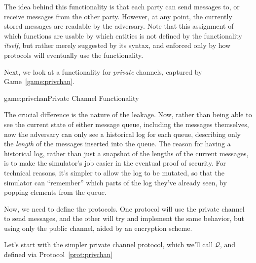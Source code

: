 The idea behind this functionality is that each party can send messages to,
or receive messages from the other party.
However, at any point, the currently stored messages are readable by
the adversary.
Note that this assignment of which functions
are usable by which entities is not defined by the functionality \emph{itself},
but rather merely suggested by its syntax, and enforced only by how
protocols will eventually use the functionality.

Next, we look at a functionality for \emph{private} channels,
captured by Game~\ref{game:privchan}.

\begin{game}{game:privchan}{Private Channel Functionality}
\end{game}

The crucial difference is the nature of the leakage.
Now, rather than being able to see the current state of either message queue,
including the messages themselves, now the adversary can only
see a historical log for each queue, describing only the \emph{length}
of the messages inserted into the queue.
The reason for having a historical log, rather than just a snapshot
of the lengths of the current messages,
is to make the simulator's job easier
in the eventual proof of security.
For technical reasons, it's simpler to allow the log to be mutated,
so that the simulator can ``remember'' which parts of the log they've
already seen, by popping elements from the queue.

Now, we need to define the protocols.
One protocol will use the private channel to send messages,
and the other will try and implement the same behavior,
but using only the public channel, aided by an encryption scheme.

Let's start with the simpler private channel protocol, which we'll
call $\mathscr{Q}$,
and defined via Protocol~\ref{prot:privchan}

